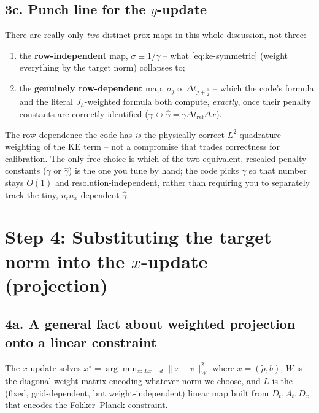 \documentclass[11pt]{article}
\newcommand{\dt}{\Delta t}
\newcommand{\dx}{\Delta x}
\newcommand{\half}{\tfrac12}
\begin{document}
\subsection*{3c. Punch line for the $y$-update}

There are really only \emph{two} distinct prox maps in this whole discussion, not three:
\begin{enumerate}
\item the \textbf{row-independent} map, $\sigma\equiv1/\gamma$ -- what \eqref{eq:ke-symmetric}
  (weight everything by the target norm) collapses to;
\item the \textbf{genuinely row-dependent} map, $\sigma_j\propto\dt_{j+\half}$ -- which the code's
  formula and the literal $J_h$-weighted formula both compute, \emph{exactly}, once their penalty
  constants are correctly identified ($\gamma\leftrightarrow\hat\gamma=\gamma\dt_\mathrm{ref}\dx$).
\end{enumerate}
The row-dependence the code has \emph{is} the physically correct $L^2$-quadrature weighting of the
KE term -- not a compromise that trades correctness for calibration. The only free choice is which
of the two equivalent, rescaled penalty constants ($\gamma$ or $\hat\gamma$) is the one you tune by
hand; the code picks $\gamma$ so that number stays $O(1)$ and resolution-independent, rather than
requiring you to separately track the tiny, $n_t n_x$-dependent $\hat\gamma$.

\section*{Step 4: Substituting the target norm into the $x$-update (projection)}

\subsection*{4a. A general fact about weighted projection onto a linear constraint}

The $x$-update solves $x^\star=\arg\min_{x:\,Lx=d}\|x-v\|^2_W$ where $x=(\tilde\rho,b)$,
$W$ is the diagonal weight matrix encoding whatever norm we choose, and $L$ is the (fixed,
grid-dependent, but weight-independent) linear map built from $D_t,A_t,D_x$ that encodes the
Fokker--Planck constraint.
\end{document}
